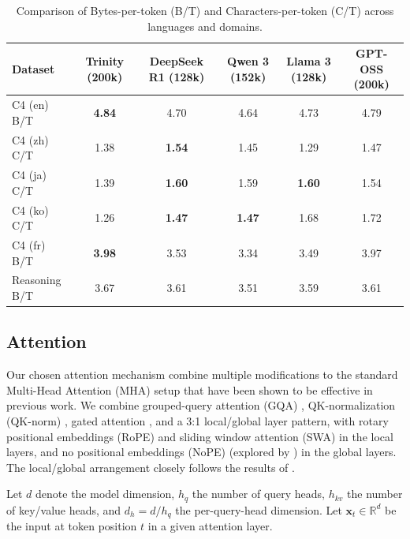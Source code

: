 \documentclass{article}
\begin{document}
\begin{table}[ht]
    \centering
    \caption{Comparison of Bytes-per-token (B/T) and Characters-per-token (C/T) across languages and domains.}
    \label{tab:efficiency}
    \vspace{0.5em}
    \begin{tabular}{lccccc}
        \toprule
        Dataset & Trinity (200k) & DeepSeek R1 (128k) & Qwen 3 (152k) & Llama 3 (128k) & GPT-OSS (200k) \\
        \midrule
        C4 (en) B/T & \textbf{4.84} & 4.70 & 4.64 & 4.73 & 4.79 \\
        C4 (zh) C/T & 1.38 & \textbf{1.54} & 1.45 & 1.29 & 1.47 \\
        C4 (ja) C/T & 1.39 & \textbf{1.60} & 1.59 & \textbf{1.60} & 1.54 \\
        C4 (ko) C/T & 1.26 & \textbf{1.47} & \textbf{1.47} & 1.68 & 1.72 \\
        C4 (fr) B/T & \textbf{3.98} & 3.53 & 3.34 & 3.49 & 3.97 \\
        Reasoning B/T & 3.67 & 3.61 & 3.51 & 3.59 & 3.61 \\
        \bottomrule
    \end{tabular}
\end{table}

\subsection{Attention}

Our chosen attention mechanism combine multiple modifications to the standard Multi-Head Attention (MHA) \citep{vaswani2023attentionneed} setup that have been shown to be effective in previous work. We combine grouped-query attention (GQA) \citep{ainslie2023gqatraininggeneralizedmultiquery}, QK-normalization (QK-norm) \citep{henry2020querykeynormalizationtransformers}, gated attention \citep{qiu2025gatedattentionlargelanguage}, and a 3:1 local/global layer pattern, with rotary positional embeddings (RoPE) \citep{su2023roformerenhancedtransformerrotary} and sliding window attention (SWA) \citep{jiang2023mistral7b, gemmateam2024gemma2improvingopen, beltagy2020longformerlongdocumenttransformer, child2019generatinglongsequencessparse} in the local layers, and no positional embeddings (NoPE) (explored by \cite{kazemnejad2023impactpositionalencodinglength}) in the global layers. The local/global arrangement closely follows the results of \cite{yang2025ropenopeagainnew}.

Let $d$ denote the model dimension, $h_q$ the number of query heads, $h_{kv}$ the number of key/value heads, and $d_h = d/h_q$ the per-query-head dimension.
Let $\mathbf{x}_t \in \mathbb{R}^d$ be the input at token position $t$ in a given attention layer.
\end{document}
